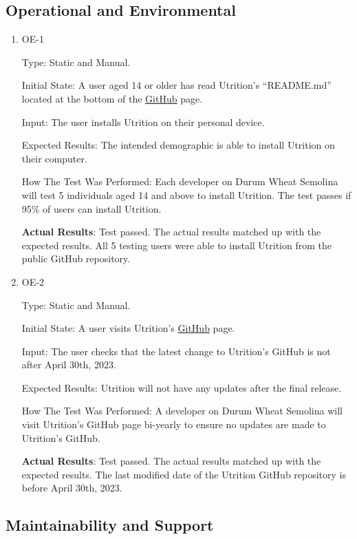 \documentclass[12pt, titlepage]{article}
\begin{document}
	\subsection{Operational and Environmental}
	
	\begin{enumerate}
		
		\item{OE-1} 
		
		Type: Static and Manual.
		
		Initial State: A user aged 14 or older has read Utrition’s “README.md” located at the bottom of the \href{https://github.com/jeff-rey-wang/utrition/}{GitHub} page.
		
		Input: The user installs Utrition on their personal device.
		
		Expected Results: The intended demographic is able to install Utrition on their computer.
		
		How The Test Was Performed: Each developer on Durum Wheat Semolina will test 5 individuals aged 14 and above to install Utrition. The test passes if 95\% of users can install Utrition.
		
		\textbf{Actual Results}: Test passed. The actual results matched up with the expected results. All 5 testing users were able to install Utrition from the public GitHub repository.
		
		\item{OE-2} 
		
		Type: Static and Manual.
		
		Initial State: A user visits Utrition’s \href{https://github.com/jeff-rey-wang/utrition/}{GitHub} page.
		
		Input: The user checks that the latest change to Utrition’s GitHub is not after April 30th, 2023.
		
		Expected Results: Utrition will not have any updates after the final release.
		
		How The Test Was Performed: A developer on Durum Wheat Semolina will visit Utrition’s GitHub page bi-yearly to ensure no updates are made to Utrition’s GitHub.
		
		\textbf{Actual Results}: Test passed. The actual results matched up with the expected results. The last modified date of the Utrition GitHub repository is before April 30th, 2023.
		
	\end{enumerate}
	
	\subsection{Maintainability and Support}
	
\end{document}
